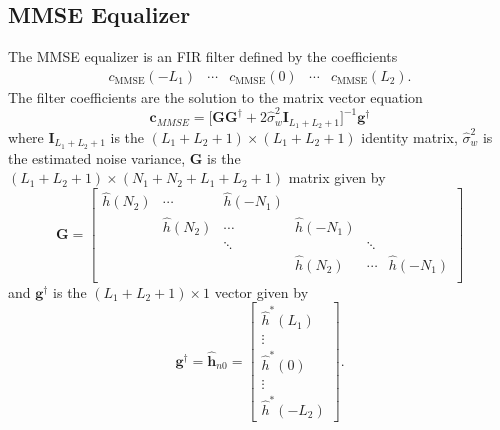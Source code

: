 \subsection{MMSE Equalizer}
The MMSE equalizer is an FIR filter defined by the coefficients
\begin{equation}
\begin{matrix}
c_\text{MMSE}(-L_1) & \cdots & c_\text{MMSE}(0) & \cdots & c_\text{MMSE}(L_2).
\end{matrix}
\end{equation}
The filter coefficients are the solution to the matrix vector equation \cite[eq. (330) and (333)]{PAQ-phase1}
\begin{equation}
\mathbf{c}_{MMSE} = \big[ \mathbf{G}\mathbf{G}^\dagger + 2\hat{\sigma}^2_w\mathbf{I}_{L_1+L_2+1} \big]^{-1} \mathbf{g}^\dagger
\label{eq:c_MMSE_direct}
\end{equation}
where $\mathbf{I}_{L_1+L_2+1}$ is the $(L_1+L_2+1)\times(L_1+L_2+1)$ identity matrix,
$\hat{\sigma}^2_w$ is the estimated noise variance, $\mathbf{G}$ is the $(L_1+L_2+1)\times(N_1+N_2+L_1+L_2+1)$ matrix given by
\begin{equation}
\mathbf{G} = 
		\begin{bmatrix}
		\hat{h}(N_2)		& \cdots		& \hat{h}(-N_1) 	&  				  \\
							& \hat{h}(N_2)	& \cdots 			& \hat{h}(-N_1)	  \\
				 			& 				& \ddots 			&  				& \ddots	  \\
		 					&  	   			&  					& \hat{h}(N_2)	& \cdots	& \hat{h}(-N_1)	\\
	\end{bmatrix}
\end{equation}
and $\mathbf{g}^\dagger$ is the $(L_1+L_2+1)\times1$ vector given by
\begin{equation}
\mathbf{g}^\dagger = \hat{\mathbf{h}}_{n0} = \begin{bmatrix} \hat{h}^\ast(L_1) \\ \vdots \\ \hat{h}^\ast(0) \\ \vdots \\ \hat{h}^\ast(-L_2)  \end{bmatrix}.
\label{eq:g_dagger_h_n0}
\end{equation}


